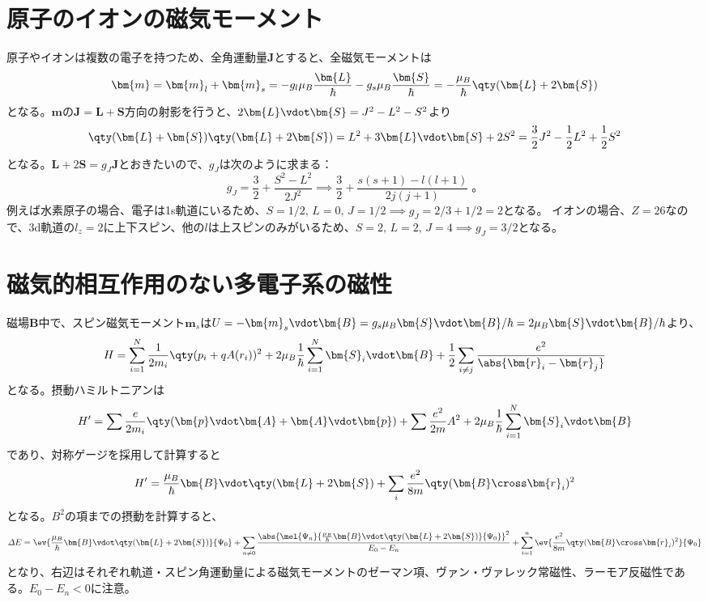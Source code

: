 \section{原子のイオンの磁気モーメント}
原子やイオンは複数の電子を持つため、全角運動量$\bm{J}$とすると、全磁気モーメントは
\begin{equation}
	\bm{m} = \bm{m}_l +\bm{m}_s = -g_l\mu_B\frac{\bm{L}}{\hbar} - g_s\mu_B\frac{\bm{S}}{\hbar} = -\frac{\mu_B}{\hbar}\qty(\bm{L} + 2\bm{S})
\end{equation}
となる。$\bm{m}$の$\bm{J} = \bm{L}+\bm{S}$方向の射影を行うと、$2\bm{L}\vdot\bm{S} = J^2-L^2-S^2$より
\begin{equation}
	\qty(\bm{L} + \bm{S})\qty(\bm{L} + 2\bm{S}) = L^2 + 3\bm{L}\vdot\bm{S} + 2S^2 = \frac{3}{2}J^2-\frac{1}{2}L^2+\frac{1}{2}S^2
\end{equation}
となる。$\bm{L}+2\bm{S} = g_J\bm{J}$とおきたいので、$g_J$は次のように求まる：
\begin{equation}
	g_J = \frac{3}{2} + \frac{S^2-L^2}{2J^2} \implies \frac{3}{2} + \frac{s(s+1) - l(l+1)}{2j(j+1)}\;。
\end{equation}
例えば水素原子の場合、電子は1s軌道にいるため、$S = 1/2,\,L = 0,\,J=1/2\implies g_J = 2/3+1/2=2$となる。
イオンの場合、$Z=26$なので、3d軌道の$l_z=2$に上下スピン、他の$l$は上スピンのみがいるため、$S=2,\,L=2,\,J=4\implies g_J = 3/2$となる。
\section{磁気的相互作用のない多電子系の磁性}
磁場$\bm{B}$中で、スピン磁気モーメント$\bm{m}_s$は$U=-\bm{m}_s\vdot\bm{B} = g_s\mu_B\bm{S}\vdot\bm{B}/\hbar = 2\mu_B\bm{S}\vdot\bm{B}/\hbar$より、
\begin{equation}
	H = \sum_{i=1}^N \frac{1}{2m_i}\qty(p_i + qA(r_i))^2 + 2\mu_B\frac{1}{\hbar}\sum_{i=1}^N\bm{S}_{i}\vdot\bm{B} + \frac{1}{2}\sum_{i\neq j}\frac{e^2}{\abs{\bm{r}_i-\bm{r}_j}}
\end{equation}
となる。摂動ハミルトニアンは
\begin{equation}
	H' = \sum\frac{e}{2m_i}\qty(\bm{p}\vdot\bm{A} + \bm{A}\vdot\bm{p}) + \sum\frac{e^2}{2m}A^2 + 2\mu_B\frac{1}{\hbar}\sum_{i=1}^N\bm{S}_{i}\vdot\bm{B}
\end{equation}
であり、対称ゲージを採用して計算すると
\begin{equation}
	H' = \frac{\mu_B}{\hbar}\bm{B}\vdot\qty(\bm{L} + 2\bm{S}) + \sum_i\frac{e^2}{8m}\qty(\bm{B}\cross\bm{r}_i)^2
\end{equation}
となる。$B^2$の項までの摂動を計算すると、
\begin{equation}
	\varDelta E = \ev{\frac{\mu_B}{\hbar}\bm{B}\vdot\qty(\bm{L} + 2\bm{S})}{\Psi_0}
	+ \sum_{n\neq 0}\frac{\abs{\mel{\Psi_n}{\frac{\mu_B}{\hbar}\bm{B}\vdot\qty(\bm{L} + 2\bm{S})}{\Psi_0}}^2}{E_0-E_n}
	+\sum_{i=1}^n\ev{\frac{e^2}{8m}\qty(\bm{B}\cross\bm{r}_i)^2}{\Psi_0}
\end{equation}
となり、右辺はそれぞれ軌道・スピン角運動量による磁気モーメントのゼーマン項、ヴァン・ヴァレック常磁性、ラーモア反磁性である。$E_0-E_n<0$に注意。
